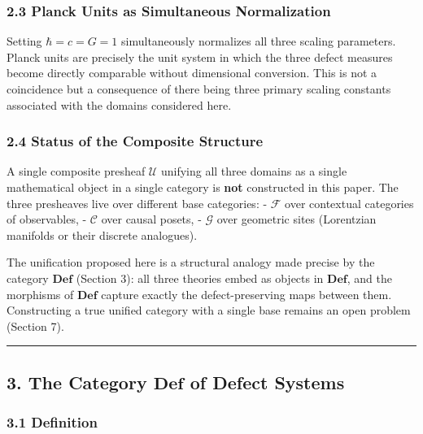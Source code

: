 \documentclass[
]{article}
\begin{document}
\subsubsection{2.3 Planck Units as Simultaneous
Normalization}\label{planck-units-as-simultaneous-normalization}

Setting \(\hbar = c = G = 1\) simultaneously normalizes all three
scaling parameters. Planck units are precisely the unit system in which
the three defect measures become directly comparable without dimensional
conversion. This is not a coincidence but a consequence of there being
three primary scaling constants associated with the domains considered
here.

\subsubsection{2.4 Status of the Composite
Structure}\label{status-of-the-composite-structure}

A single composite presheaf \(\mathcal{U}\) unifying all three domains
as a single mathematical object in a single category is \textbf{not}
constructed in this paper. The three presheaves live over different base
categories: - \(\mathcal{F}\) over contextual categories of observables,
- \(\mathcal{C}\) over causal posets, - \(\mathcal{G}\) over geometric
sites (Lorentzian manifolds or their discrete analogues).

The unification proposed here is a structural analogy made precise by
the category \(\mathbf{Def}\) (Section 3): all three theories embed as
objects in \(\mathbf{Def}\), and the morphisms of \(\mathbf{Def}\)
capture exactly the defect-preserving maps between them. Constructing a
true unified category with a single base remains an open problem
(Section 7).

\begin{center}\rule{0.5\linewidth}{0.5pt}\end{center}

\subsection{\texorpdfstring{3. The Category \(\mathbf{Def}\) of Defect
Systems}{3. The Category \textbackslash mathbf\{Def\} of Defect Systems}}\label{the-category-mathbfdef-of-defect-systems}

\subsubsection{3.1 Definition}\label{definition}
\end{document}
